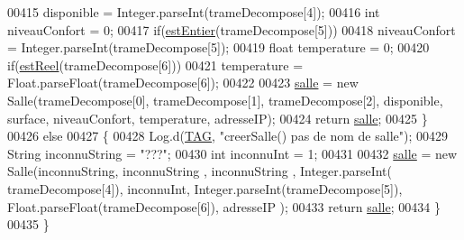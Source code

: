 \begin{DoxyCode}
00415                 disponible = Integer.parseInt(trameDecompose[4]);
00416             \textcolor{keywordtype}{int} niveauConfort = 0;
00417             \textcolor{keywordflow}{if}(\hyperlink{classcom_1_1lasalle_1_1meeting_1_1_main_activity_a3841414e5b270c189de0d58bbd2aca57}{estEntier}(trameDecompose[5]))
00418                 niveauConfort = Integer.parseInt(trameDecompose[5]);
00419             \textcolor{keywordtype}{float} temperature = 0;
00420             \textcolor{keywordflow}{if}(\hyperlink{classcom_1_1lasalle_1_1meeting_1_1_main_activity_a8d0cd387540353465b1982157b20631c}{estReel}(trameDecompose[6]))
00421                 temperature = Float.parseFloat(trameDecompose[6]);
00422 
00423             \hyperlink{classcom_1_1lasalle_1_1meeting_1_1_main_activity_a5d76e925ebb88ff19eca5a30b5ca4588}{salle} = \textcolor{keyword}{new} Salle(trameDecompose[0], trameDecompose[1], trameDecompose[2], disponible, 
      surface, niveauConfort, temperature, adresseIP);
00424             \textcolor{keywordflow}{return} \hyperlink{classcom_1_1lasalle_1_1meeting_1_1_main_activity_a5d76e925ebb88ff19eca5a30b5ca4588}{salle};
00425         \}
00426         \textcolor{keywordflow}{else}
00427         \{
00428             Log.d(\hyperlink{classcom_1_1lasalle_1_1meeting_1_1_main_activity_a8f934680ad3a7ec4ad0fea748f0b7506}{TAG}, \textcolor{stringliteral}{"creerSalle() pas de nom de salle"});
00429             String inconnuString = \textcolor{stringliteral}{"???"};
00430             \textcolor{keywordtype}{int} inconnuInt = 1;
00431 
00432             \hyperlink{classcom_1_1lasalle_1_1meeting_1_1_main_activity_a5d76e925ebb88ff19eca5a30b5ca4588}{salle} = \textcolor{keyword}{new} Salle(inconnuString, inconnuString , inconnuString , Integer.parseInt(
      trameDecompose[4]), inconnuInt,  Integer.parseInt(trameDecompose[5]), Float.parseFloat(trameDecompose[6]), adresseIP
      );
00433             \textcolor{keywordflow}{return} \hyperlink{classcom_1_1lasalle_1_1meeting_1_1_main_activity_a5d76e925ebb88ff19eca5a30b5ca4588}{salle};
00434         \}
00435     \}
\end{DoxyCode}
\mbox{\label{classcom_1_1lasalle_1_1meeting_1_1_main_activity_ab9a644c245dafa25dc2ef9d099565425}} 
